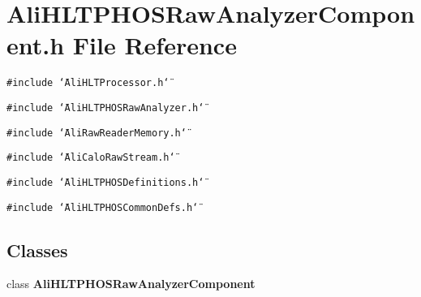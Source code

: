 \section{Ali\-HLTPHOSRaw\-Analyzer\-Component.h File Reference}
\label{AliHLTPHOSRawAnalyzerComponent_8h}


{\tt \#include \char`\"{}Ali\-HLTProcessor.h\char`\"{}}\par
{\tt \#include \char`\"{}Ali\-HLTPHOSRaw\-Analyzer.h\char`\"{}}\par
{\tt \#include \char`\"{}Ali\-Raw\-Reader\-Memory.h\char`\"{}}\par
{\tt \#include \char`\"{}Ali\-Calo\-Raw\-Stream.h\char`\"{}}\par
{\tt \#include \char`\"{}Ali\-HLTPHOSDefinitions.h\char`\"{}}\par
{\tt \#include \char`\"{}Ali\-HLTPHOSCommon\-Defs.h\char`\"{}}\par
\subsection*{Classes}
\begin{CompactItemize}
\item 
class {\bf Ali\-HLTPHOSRaw\-Analyzer\-Component}
\end{CompactItemize}
